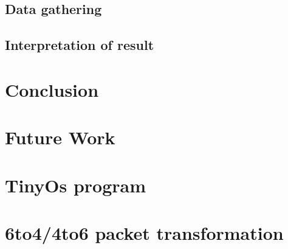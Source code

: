 \documentclass[oneside,12pt,a4paper,final]{book}
\begin{document}
\section{Data gathering}
\section{Interpretation of result}

\chapter{Conclusion}

\chapter{Future Work}

\appendix
\chapter{TinyOs program}
\chapter{6to4/4to6 packet transformation}

\backmatter

\singlespacing
\printglossaries
 

\end{document}
